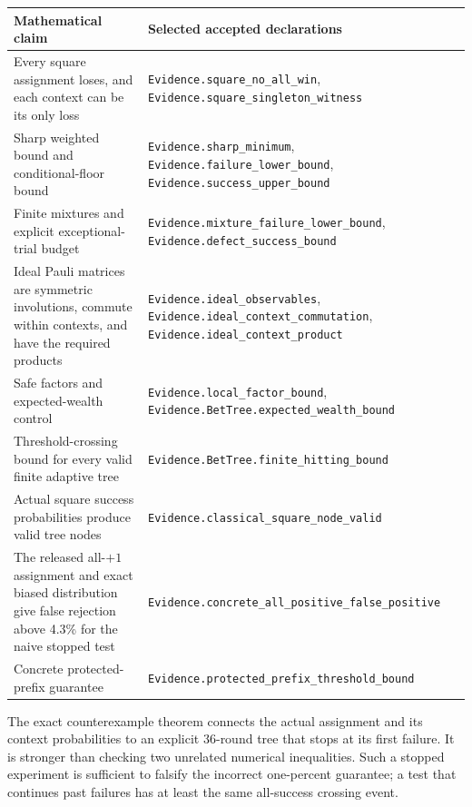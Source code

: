 \documentclass[10pt,a4paper]{article}
\begin{document}
{\def\LTcaptype{none} %
\begin{longtable}[]{@{}
  >{\raggedright\arraybackslash}p{}
  >{\raggedright\arraybackslash}p{}@{}}
\toprule\noalign{}
\begin{minipage}[b]{\linewidth}\raggedright
Mathematical claim
\end{minipage} & \begin{minipage}[b]{\linewidth}\raggedright
Selected accepted declarations
\end{minipage} \\
\midrule\noalign{}
\endhead
\bottomrule\noalign{}
\endlastfoot
Every square assignment loses, and each context can be its only loss &
\texttt{Evidence.square\_no\_all\_win},
\texttt{Evidence.square\_singleton\_witness} \\
Sharp weighted bound and conditional-floor bound &
\texttt{Evidence.sharp\_minimum},
\texttt{Evidence.failure\_lower\_bound},
\texttt{Evidence.success\_upper\_bound} \\
Finite mixtures and explicit exceptional-trial budget &
\texttt{Evidence.mixture\_failure\_lower\_bound},
\texttt{Evidence.defect\_success\_bound} \\
Ideal Pauli matrices are symmetric involutions, commute within contexts,
and have the required products & \texttt{Evidence.ideal\_observables},
\texttt{Evidence.ideal\_context\_commutation},
\texttt{Evidence.ideal\_context\_product} \\
Safe factors and expected-wealth control &
\texttt{Evidence.local\_factor\_bound},
\texttt{Evidence.BetTree.expected\_wealth\_bound} \\
Threshold-crossing bound for every valid finite adaptive tree &
\texttt{Evidence.BetTree.finite\_hitting\_bound} \\
Actual square success probabilities produce valid tree nodes &
\texttt{Evidence.classical\_square\_node\_valid} \\
The released all-\(+1\) assignment and exact biased distribution give
false rejection above 4.3\% for the naive stopped test &
\texttt{Evidence.concrete\_all\_positive\_false\_positive} \\
Concrete protected-prefix guarantee &
\texttt{Evidence.protected\_prefix\_threshold\_bound} \\
\end{longtable}
}

The exact counterexample theorem connects the actual assignment and its
context probabilities to an explicit 36-round tree that stops at its
first failure. It is stronger than checking two unrelated numerical
inequalities. Such a stopped experiment is sufficient to falsify the
incorrect one-percent guarantee; a test that continues past failures has
at least the same all-success crossing event.
\end{document}
